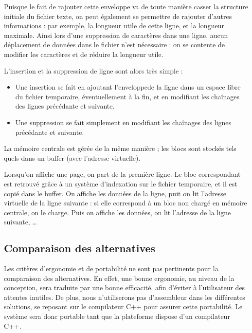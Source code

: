 Puisque le fait de rajouter cette \og enveloppe \fg va de toute manière \og casser \fg la structure initiale du fichier texte, on peut également se permettre de rajouter d'autres informations : par exemple, la longueur utile de cette ligne, et la longueur maximale. Ainsi lors d'une suppression de caractères dans une ligne, aucun déplacement de données dans le fichier n'est nécessaire : on se contente de modifier les caractères et de réduire la longueur utile.

L'insertion et la suppression de ligne sont alors très simple :
\begin{itemize}
	\item Une insertion se fait en ajoutant l'\og enveloppe\fg de la ligne dans un espace libre du fichier temporaire, éventuellement à la fin, et en modifiant les chaînages des lignes précédante et suivante.
	\item Une suppression se fait simplement en modifiant les chaînages des lignes précédante et suivante.
\end{itemize}

La mémoire centrale est gérée de la même manière ; les blocs sont stockés tels quels dans un buffer (avec l'adresse virtuelle).

Lorsqu'on affiche une page, on part de la première ligne. Le bloc correspondant est retrouvé grâce à un système d'indexation sur le fichier temporaire, et il est copié dans le buffer. On affiche les données de la ligne, puit on lit l'adresse virtuelle de la ligne suivante : si elle correspond à un bloc non chargé en mémoire centrale, on le charge. Puis on affiche les données, on lit l'adresse de la ligne suivante, \ldots


\subsection{Comparaison des alternatives}

Les critères d'ergonomie et de portabilité ne sont pas pertinents pour la
comparaison des alternatives.
En effet, une bonne ergonomie, au niveau de la conception, sera traduite par une
bonne efficacité, afin d'éviter à l'utilisateur des attentes inutiles.
De plus, nous n'utiliserons pas d'assembleur dans les différentes solutions, se
reposant sur le compilateur C++ pour assurer cette portabilité. Le système sera
donc portable tant que la plateforme dispose d'un compilateur C++.

